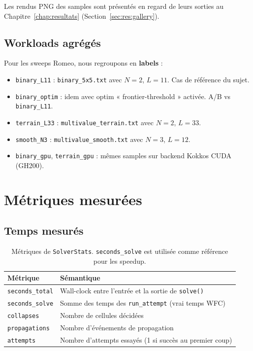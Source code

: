 Les rendus PNG des samples sont présentés en regard de leurs sorties
au Chapitre~\ref{chap:resultats} (Section~\ref{sec:res:gallery}).

\subsection{Workloads agrégés}

Pour les sweeps Romeo, nous regroupons en \textbf{labels} :

\begin{itemize}
    \item \texttt{binary\_L11} : \texttt{binary\_5x5.txt} avec $N=2$, $L=11$. Cas de référence du sujet.
    \item \texttt{binary\_optim} : idem avec optim « frontier-threshold » activée. A/B vs \texttt{binary\_L11}.
    \item \texttt{terrain\_L33} : \texttt{multivalue\_terrain.txt} avec $N=2$, $L=33$.
    \item \texttt{smooth\_N3} : \texttt{multivalue\_smooth.txt} avec $N=3$, $L=12$.
    \item \texttt{binary\_gpu}, \texttt{terrain\_gpu} : mêmes samples sur backend Kokkos CUDA (GH200).
\end{itemize}

\section{Métriques mesurées}
\label{sec:proto:metriques}

\subsection{Temps mesurés}

\begin{table}[H]
\centering
\begin{tabularx}{\textwidth}{lX}
\toprule
\textbf{Métrique} & \textbf{Sémantique} \\
\midrule
\texttt{seconds\_total} & Wall-clock entre l'entrée et la sortie de \texttt{solve()} \\
\texttt{seconds\_solve} & Somme des temps des \texttt{run\_attempt} (vrai temps WFC) \\
\texttt{collapses} & Nombre de cellules décidées \\
\texttt{propagations} & Nombre d'événements de propagation \\
\texttt{attempts} & Nombre d'attempts essayés (1 si succès au premier coup) \\
\bottomrule
\end{tabularx}
\caption{Métriques de \texttt{SolverStats}. \texttt{seconds\_solve} est utilisée comme référence pour les speedup.}
\label{tab:proto:stats}
\end{table}

